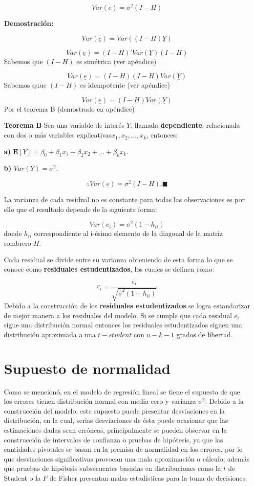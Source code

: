 \documentclass[a4paper,oneside,openany]{book}
\begin{document}
\[Var(\underline{e})=\sigma^2(I-H)\]

\textbf{Demostración:}

\[Var(\underline{e})=Var((I-H)\underline{Y})\]

\[Var(\underline{e})=(I-H)'Var(\underline{Y})(I-H)\] Sabemos que
\((I-H)\) es simétrica (ver apéndice)

\[Var(\underline{e})=(I-H)(I-H)Var(\underline{Y})\] Sabemos quue
\((I-H)\) es idempotente (ver apéndice)

\[Var(\underline{e})=(I-H)Var(\underline{Y})\] Por el teorema B
(demostrado en apéndice)

\textbf{Teorema B} Sea una variable de interés \(\underline{Y}\),
llamada \textbf{dependiente}, relacionada con dos o más variables
explicativas\(x_{1},x_{2},\ldots,x_{k}\), entonces:

\textbf{a)}
\(\mathbf{E}[\underline{Y}]= \beta_{0}+\beta_{1}x_{1}+\beta_{2}x_{2}+ \ldots + \beta_{k}x_{k}.\)

\textbf{b)} \(Var(\underline{Y})= \sigma^2.\)

\[\therefore Var(\underline{e})=\sigma^2(I-H). \blacksquare\]

La varianza de cada residual no es constante para todas las
observaciones es por ello que el resultado depende de la siguiente
forma:

\[Var(e_{i})=\sigma^2(1-h_{ii})\] donde \(h_{ii}\) correspondiente al
i-ésimo elemento de la diagonal de la matriz sombrero \(H\).

Cada residual se divide entre su varianza obteniendo de esta forma lo
que se conoce como \textbf{residuales estudentizados}, los cuales se
definen como:

\[r_{i}=\frac{e_{i}}{\sqrt{\hat{\sigma}^2(1-h_{ii})}}\] Debido a la
construcción de los \textbf{residuales estudentizados} se logra
estandarizar de mejor manera a los residuales del modelo. Si se cumple
que cada residual \(e_{i}\) sigue una distribución normal entonces los
residuales estudentizados siguen una distribución aproximada a una
\(t-student\) con \(n-k-1\) grados de libertad.

\section{Supuesto de normalidad}\label{supuesto-de-normalidad}

Como se mencionó, en el modelo de regresión lineal se tiene el supuesto
de que los errores tienen distribución normal con media cero y varianza
\(\sigma^2\). Debido a la construcción del modelo, este supuesto puede
presentar desviaciones en la distribución, en la cual, serias
desviaciones de ésta puede ocasionar que las estimaciones dadas sean
erróneas, principalmente se pueden observar en la construcción de
intervalos de confianza o pruebas de hipótesis, ya que las cantidades
pivotales se basan en la premisa de normalidad en los errores, por lo
que desviaciones significativas provocan una mala aproximación o
cálculo; además que pruebas de hipótesis subsecuentes basadas en
distribuciones como la \(t\) de Student o la \(F\) de Fisher presentan
malas estadísticas para la toma de decisiones.
\end{document}
